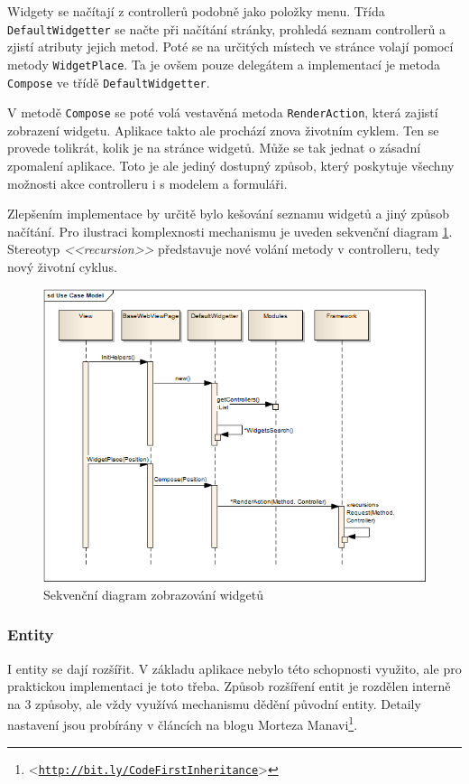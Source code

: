 \documentclass[11pt,twoside,a4paper]{book}
\let\oldUrl\url
\renewcommand\url[1]{<\texttt{\oldUrl{#1}}>}
\begin{document}
Widgety se načítají z controllerů podobně jako položky menu. Třída \texttt{DefaultWidgetter} se načte při načítání stránky, prohledá seznam controllerů a zjistí atributy jejich metod. Poté se na určitých místech ve stránce volají pomocí metody \texttt{WidgetPlace}. Ta je ovšem pouze delegátem a implementací je metoda \texttt{Compose} ve třídě \texttt{DefaultWidgetter}.

V metodě \texttt{Compose} se poté volá vestavěná metoda \texttt{RenderAction}, která zajistí zobrazení widgetu. Aplikace takto ale prochází znova životním cyklem. Ten se provede tolikrát, kolik je na stránce widgetů. Může se tak jednat o zásadní zpomalení aplikace. Toto je ale jediný dostupný způsob, který poskytuje všechny možnosti akce controlleru i s modelem a formuláři.

Zlepšením implementace by určitě bylo kešování seznamu widgetů a jiný způsob načítání. Pro ilustraci komplexnosti mechanismu je uveden sekvenční diagram \ref{fig:widgety}. Stereotyp \textit{<<recursion>>} představuje nové volání metody v controlleru, tedy nový životní cyklus.

\begin{figure}[h!]
\begin{center}
\includegraphics[scale=0.71]{figures/widgety}
\caption{Sekvenční diagram zobrazování widgetů}
\label{fig:widgety}
\end{center}
\end{figure}

\subsubsection{Entity}
\label{subsec:pripojenientit}
I entity se dají rozšířit. V základu aplikace nebylo této schopnosti využito, ale pro praktickou implementaci je toto třeba. Způsob rozšíření entit je rozdělen interně na 3 způsoby, ale vždy využívá mechanismu dědění původní entity. Detaily nastavení jsou probírány v článcích na blogu Morteza Manavi\footnote{\url{http://bit.ly/CodeFirstInheritance}}.
\end{document}
